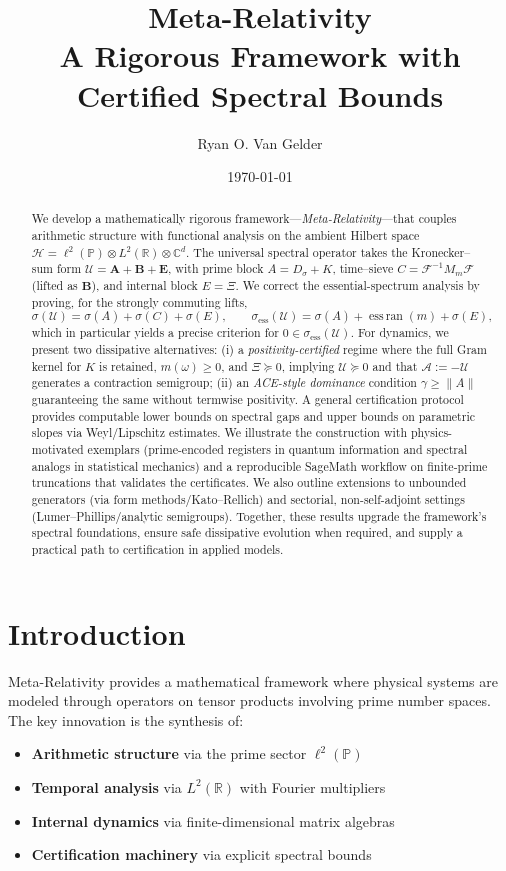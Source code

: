 \documentclass[10pt]{article}
\title{Meta-Relativity \\ A Rigorous Framework with Certified Spectral Bounds}
\author{Ryan O. Van Gelder}
\date{\today}
\begin{document}
\maketitle

\begin{abstract}
We develop a mathematically rigorous framework---\emph{Meta-Relativity}---that couples arithmetic structure with functional analysis on the ambient Hilbert space
\(\mathcal H=\ell^{2}(\mathbb P)\otimes L^{2}(\mathbb R)\otimes\mathbb C^{d}\).
The universal spectral operator takes the Kronecker--sum form
\(\mathcal U=\mathbf A+\mathbf B+\mathbf E\),
with prime block \(A=D_{\sigma}+K\), time–sieve \(C=\mathcal F^{-1}M_m\mathcal F\) (lifted as \(\mathbf B\)), and internal block \(E=\Xi\).
We correct the essential-spectrum analysis by proving, for the strongly commuting lifts,
\[
\sigma(\mathcal U)=\sigma(A)+\sigma(C)+\sigma(E),\qquad
\sigma_{\mathrm{ess}}(\mathcal U)=\sigma(A)+\operatorname{ess\,ran}(m)+\sigma(E),
\]
which in particular yields a precise criterion for \(0\in\sigma_{\mathrm{ess}}(\mathcal U)\).
For dynamics, we present two dissipative alternatives:
(i) a \emph{positivity-certified} regime where the full Gram kernel for \(K\) is retained, \(m(\omega)\ge 0\), and \(\Xi\succeq0\), implying \(\mathcal U\succeq0\) and that
\(\mathcal A:=-\mathcal U\) generates a contraction semigroup;
(ii) an \emph{ACE-style dominance} condition \(\gamma\ge\|A\|\) guaranteeing the same without termwise positivity.
A general certification protocol provides computable lower bounds on spectral gaps and upper bounds on parametric slopes via Weyl/Lipschitz estimates.
We illustrate the construction with physics-motivated exemplars (prime-encoded registers in quantum information and spectral analogs in statistical mechanics) and a reproducible SageMath workflow on finite-prime truncations that validates the certificates.
We also outline extensions to unbounded generators (via form methods/Kato--Rellich) and sectorial, non-self-adjoint settings (Lumer--Phillips/analytic semigroups).
Together, these results upgrade the framework's spectral foundations, ensure safe dissipative evolution when required, and supply a practical path to certification in applied models.
\end{abstract}

\newpage
\section{Introduction}

Meta-Relativity provides a mathematical framework where physical systems are modeled through operators on tensor products involving prime number spaces. The key innovation is the synthesis of:
\begin{itemize}
    \item \textbf{Arithmetic structure} via the prime sector $\ell^2(\mathbb{P})$
    \item \textbf{Temporal analysis} via $L^2(\mathbb{R})$ with Fourier multipliers  
    \item \textbf{Internal dynamics} via finite-dimensional matrix algebras
    \item \textbf{Certification machinery} via explicit spectral bounds
\end{itemize}
\end{document}
